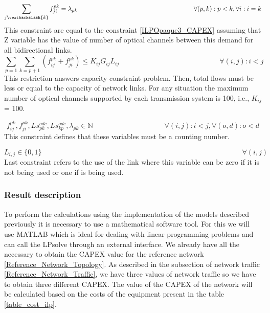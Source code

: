\begin{equation}
\sum_{j\textbackslash \{k\}} f_{ji}^{pk} = \lambda_{pk}  \qquad \qquad \qquad \qquad \qquad \qquad \qquad \qquad \qquad
\forall(p,k) : p < k, \forall i: i = k
\label{ILPTranslucp8}
\end{equation}
\noindent
This constraint are equal to the constraint \ref{ILPOpaque3_CAPEX} assuming that Z variable has the value of number of optical channels between this demand for all bidirectional links.
\newpage
\begin{equation}
\sum_{p=1} \sum_{k=p+1} \left( f_{ij}^{pk} + f_{ji}^{pk}\right) \leq K_{ij} G_{ij} L_{ij} \qquad \qquad \qquad \qquad \qquad \qquad \qquad
\forall (i,j) : i < j
\label{ILPTranslucp9}
\end{equation}
\noindent
This restriction answers capacity constraint problem. Then, total flows must be less or equal to the capacity of network links. For any situation the maximum number of optical channels supported by each transmission system is 100, i.e., $K_{ij}$ = 100.

\begin{equation}
f_{ij}^{pk} , f_{ji}^{pk} , Ls_{pk}^{odc} , Ls_{kp}^{odc} , \lambda_{pk} \in \mathbb{N}   \qquad \qquad \qquad \qquad \qquad
\forall(i,j) : i < j, \forall(o,d) : o < d
\label{ILPTranslucp10}
\end{equation}
\noindent
This constraint defines that these variables must be a counting number.

\begin{equation}
L_{i,j} \in \{0,1\} \qquad \qquad \qquad \qquad \qquad \qquad \qquad \qquad \qquad \qquad \qquad \qquad \qquad \qquad
\forall(i,j)
\label{ILPTransluc11}
\end{equation}
\noindent
Last constraint refers to the use of the link where this variable can be zero if it is not being used or one if is being used.

\vspace{18pt}
\subsubsection{Result description}

To perform the calculations using the implementation of the models described previously it is necessary to use a mathematical software tool. For this we will use MATLAB which is ideal for dealing with linear programming problems and can call the LPsolve through an external interface.
We already have all the necessary to obtain the CAPEX value for the reference network \ref{Reference_Network_Topology}. As described in the subsection of network traffic \ref{Reference_Network_Traffic}, we have three values of network traffic so we have to obtain three different CAPEX. The value of the CAPEX of the network will be calculated based on the costs of the equipment present in the table \ref{table_cost_ilp}.\\

